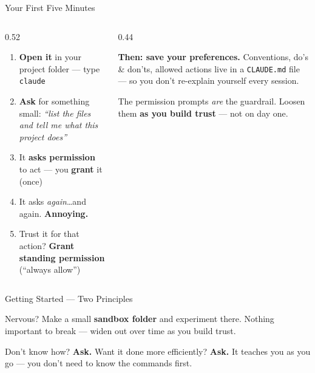 \documentclass[aspectratio=169, 10pt]{beamer}
\begin{document}
\begin{frame}[fragile]{Your First Five Minutes}
\vskip2pt
\begin{columns}[T]
\begin{column}{0.52\textwidth}
\begin{tcolorbox}[keybox, title={\faPlay\quad The loop everyone starts with}, top=3pt, bottom=3pt]
\small
\begin{enumerate}\setlength{\itemsep}{4pt}
  \item \textbf{Open it} in your project folder --- type \texttt{claude}
  \item \textbf{Ask} for something small: \textit{``list the files and tell me what this project does''}
  \item It \textbf{asks permission} to act --- you \textbf{grant} it (once)
  \item It asks \textit{again}\ldots and again. \textbf{Annoying.}
  \item Trust it for that action? \textbf{Grant standing permission} (``always allow'')
\end{enumerate}
\end{tcolorbox}
\end{column}
\begin{column}{0.44\textwidth}
\begin{tcolorbox}[accentbox, top=3pt, bottom=3pt]
\small
\textbf{Then: save your preferences.}
\vskip3pt
Conventions, do's \& don'ts, allowed actions live in a \texttt{CLAUDE.md} file --- so you don't re-explain yourself every session.
\end{tcolorbox}
\vskip4pt
\begin{tcolorbox}[quotebox, top=3pt, bottom=3pt]
\scriptsize The permission prompts \emph{are} the guardrail. Loosen them \textbf{as you build trust} --- not on day one.
\end{tcolorbox}
\end{column}
\end{columns}
\end{frame}


\begin{frame}{Getting Started --- Two Principles}
\vskip6pt
\begin{tcolorbox}[keybox, title={\faFlask\quad 1.\ Build in a ``lab'' folder}, top=3pt, bottom=3pt]
\small Nervous? Make a small \textbf{sandbox folder} and experiment there. Nothing important to break --- widen out over time as you build trust.
\end{tcolorbox}
\vskip8pt
\begin{tcolorbox}[keybox, title={\faQuestionCircle\quad 2.\ Learn by doing --- just ask it}, top=3pt, bottom=3pt]
\small Don't know how? \textbf{Ask.} Want it done more efficiently? \textbf{Ask.} It teaches you as you go --- you don't need to know the commands first.
\end{tcolorbox}
\end{frame}
\end{document}
